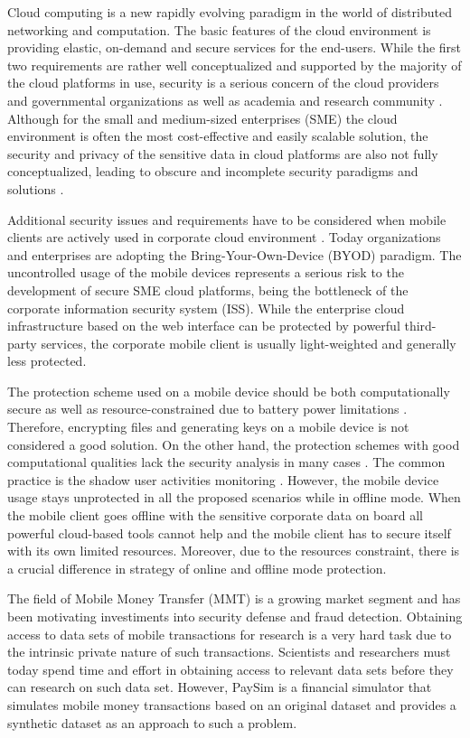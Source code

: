 Cloud computing is a new rapidly evolving paradigm in the world of distributed networking and computation. The basic features of the cloud environment is providing elastic, on-demand and secure services for the end-users. While the first two requirements are rather well conceptualized and supported by the majority of the cloud platforms in use, security is a serious concern of the cloud providers and governmental organizations as well as academia and research community \cite{csa2016,higashi2015,gartner2015}. Although for the small and medium-sized enterprises (SME) the cloud environment is often the most cost-effective and easily scalable solution, the security and privacy of the sensitive data in cloud platforms are also not fully conceptualized, leading to obscure and incomplete security paradigms and solutions \cite{galibus2017offline}.

Additional security issues and requirements have to be considered when mobile clients are actively used in corporate cloud environment \cite{yovel2014}. Today organizations and enterprises are adopting the Bring-Your-Own-Device (BYOD) paradigm. The uncontrolled usage of the mobile devices represents a serious risk to the development of secure SME cloud platforms, being the bottleneck of the corporate information security system (ISS). While the enterprise cloud infrastructure based on the web interface can be protected by powerful third-party services, the corporate mobile client is usually light-weighted and generally less protected. 

The protection scheme used on a mobile device should be both computationally secure as well as resource-constrained due to battery power limitations \cite{khan2015cloud}. Therefore, encrypting files and generating keys on a mobile device is not considered a good solution. On the other hand, the protection schemes with good computational qualities lack the security analysis in many cases \cite{khan2014bss}. The common practice is the shadow user activities monitoring \cite{yovel2014}. However, the mobile device usage stays unprotected in all the proposed scenarios while in offline mode. When the mobile client goes offline with the sensitive corporate data on board all powerful cloud-based tools cannot help and the mobile client has to secure itself with its own limited resources. Moreover, due to the resources constraint, there is a crucial difference in strategy of online and offline mode protection.

The field of Mobile Money Transfer (MMT) is a growing market segment and has been motivating investiments into security defense and fraud detection. Obtaining access to data sets of mobile transactions for research is a very hard task due to the intrinsic private nature of such transactions. Scientists and researchers must today spend time and effort in obtaining access to relevant data sets before they can research on such data set. However, PaySim \cite{lopez2016paysim} is a financial simulator that simulates mobile money transactions based on an original dataset and provides a synthetic dataset as an approach to such a problem.

